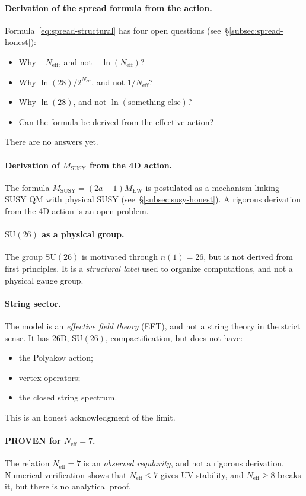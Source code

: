\documentclass[11pt,a4paper]{article}
\newcommand{\SU}{\ensuremath{\mathrm{SU}}}
\newcommand{\Neff}{\ensuremath{N_{\text{eff}}}}
\theoremstyle{definition}
\begin{document}
\paragraph{Derivation of the spread formula from the action.}
Formula~\eqref{eq:spread-structural} has four
open questions (see~\S\ref{subsec:spread-honest}):
\begin{itemize}
    \item Why $-\Neff$, and not $-\ln(\Neff)$?
    \item Why $\ln(28)/2^{\Neff}$, and not $1/\Neff$?
    \item Why $\ln(28)$, and not $\ln(\text{something else})$?
    \item Can the formula be derived from the effective action?
\end{itemize}
There are no answers yet.

\paragraph{Derivation of $M_{\text{SUSY}}$ from the 4D action.}
The formula $M_{\text{SUSY}} = (2a-1) M_{\text{EW}}$ is postulated
as a mechanism linking SUSY QM with physical SUSY
(see~\S\ref{subsec:susy-honest}). A rigorous derivation from the 4D action
is an open problem.

\paragraph{\texorpdfstring{$\SU(26)$}{(26)} as a physical group.}
The group $\SU(26)$ is motivated through $n(1) = 26$, but is not derived
from first principles. It is a \emph{structural label} used
to organize computations, and not a physical gauge group.

\paragraph{String sector.}
The model is an \emph{effective field theory} (EFT), and not a string
theory in the strict sense. It has 26D, $\SU(26)$,
compactification, but does not have:
\begin{itemize}
    \item the Polyakov action;
    \item vertex operators;
    \item the closed string spectrum.
\end{itemize}
This is an honest acknowledgment of the limit.

\paragraph{PROVEN for $N_{\text{eff}} = 7$.}
The relation $N_{\text{eff}} = 7$ is an \emph{observed regularity},
and not a rigorous derivation. Numerical verification shows that
$N_{\text{eff}} \le 7$ gives UV stability, and $N_{\text{eff}} \ge 8$
breaks it, but there is no analytical proof.
\end{document}
